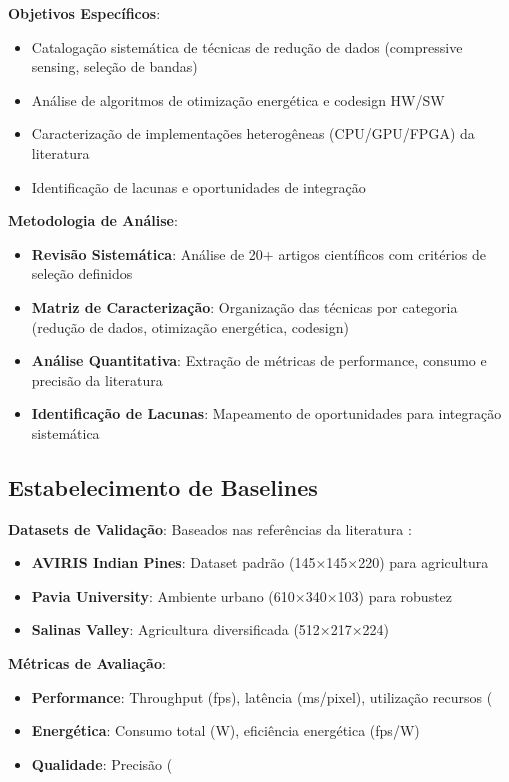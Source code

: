 \textbf{Objetivos Específicos}:
\begin{itemize}
\item Catalogação sistemática de técnicas de redução de dados (compressive sensing, seleção de bandas)
\item Análise de algoritmos de otimização energética e codesign HW/SW
\item Caracterização de implementações heterogêneas (CPU/GPU/FPGA) da literatura
\item Identificação de lacunas e oportunidades de integração
\end{itemize}

\textbf{Metodologia de Análise}:
\begin{itemize}
\item \textbf{Revisão Sistemática}: Análise de 20+ artigos científicos com critérios de seleção definidos
\item \textbf{Matriz de Caracterização}: Organização das técnicas por categoria (redução de dados, otimização energética, codesign)
\item \textbf{Análise Quantitativa}: Extração de métricas de performance, consumo e precisão da literatura
\item \textbf{Identificação de Lacunas}: Mapeamento de oportunidades para integração sistemática
\end{itemize}

\subsection{Estabelecimento de Baselines}

\textbf{Datasets de Validação}:
Baseados nas referências da literatura \cite{lou2024, ullah2020}:
\begin{itemize}
\item \textbf{AVIRIS Indian Pines}: Dataset padrão (145×145×220) para agricultura
\item \textbf{Pavia University}: Ambiente urbano (610×340×103) para robustez
\item \textbf{Salinas Valley}: Agricultura diversificada (512×217×224)
\end{itemize}

\textbf{Métricas de Avaliação}:
\begin{itemize}
\item \textbf{Performance}: Throughput (fps), latência (ms/pixel), utilização recursos (%
\item \textbf{Energética}: Consumo total (W), eficiência energética (fps/W)
\item \textbf{Qualidade}: Precisão (%
\end{itemize}

